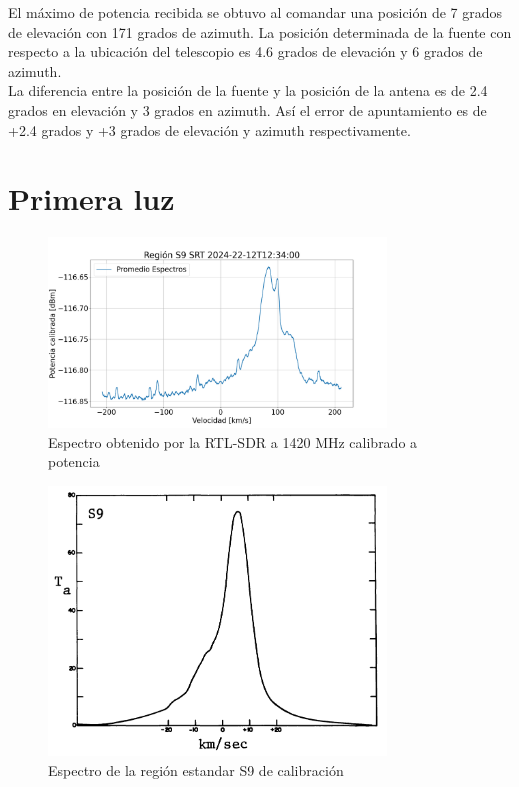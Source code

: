 El máximo de potencia recibida se obtuvo al comandar una posición de 7 grados de elevación con 171 grados de azimuth. La posición determinada de la fuente con respecto a la ubicación del telescopio es 4.6 grados de elevación y 6 grados de azimuth.\\

La diferencia entre la posición de la fuente y la posición de la antena es de 2.4 grados en elevación y 3 grados en azimuth. Así el error de apuntamiento es de +2.4 grados y +3 grados de elevación y azimuth respectivamente.\\


\section{Primera luz}

\begin{figure}
    \centering
    \includegraphics[width=0.8\textwidth]{img/h1speed}
    \caption{Espectro obtenido por la RTL-SDR a 1420 MHz calibrado a potencia}
    \label{fig:firstlight}
\end{figure}

\begin{figure}
    \centering
    \includegraphics[width=0.8\textwidth]{img/williams}
    \caption{Espectro de la región estandar S9 de calibración \cite{williams73}}
    \label{fig:williams}
\end{figure}

